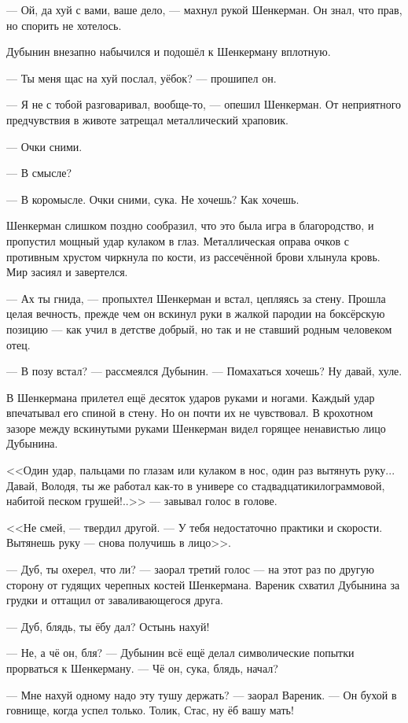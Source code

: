 --- Ой, да хуй с вами, ваше дело, --- махнул рукой Шенкерман.
Он знал, что прав, но спорить не хотелось.

Дубынин внезапно набычился и подошёл к Шенкерману вплотную.

--- Ты меня щас на хуй послал, уёбок? --- прошипел он.

--- Я не с тобой разговаривал, вообще-то, --- опешил Шенкерман.
От неприятного предчувствия в животе затрещал металлический храповик.

--- Очки сними.

--- В смысле?

--- В коромысле.
Очки сними, сука.
Не хочешь?
Как хочешь.

Шенкерман слишком поздно сообразил, что это была игра в благородство, и пропустил мощный удар кулаком в глаз.
Металлическая оправа очков с противным хрустом чиркнула по кости, из рассечённой брови хлынула кровь.
Мир засиял и завертелся.

--- Ах ты гнида, --- пропыхтел Шенкерман и встал, цепляясь за стену.
Прошла целая вечность, прежде чем он вскинул руки в жалкой пародии на боксёрскую позицию --- как учил в детстве добрый, но так и не ставший родным человеком отец.

--- В позу встал? --- рассмеялся Дубынин.
--- Помахаться хочешь?
Ну давай, хуле.

В Шенкермана прилетел ещё десяток ударов руками и ногами.
Каждый удар впечатывал его спиной в стену.
Но он почти их не чувствовал.
В крохотном зазоре между вскинутыми руками Шенкерман видел горящее ненавистью лицо Дубынина.

<<Один удар, пальцами по глазам или кулаком в нос, один раз вытянуть руку...
Давай, Володя, ты же работал как-то в универе со стадвадцатикилограммовой, набитой песком грушей!..>> --- завывал голос в голове.

<<Не смей, --- твердил другой.
--- У тебя недостаточно практики и скорости.
Вытянешь руку --- снова получишь в лицо>>.

--- Дуб, ты охерел, что ли? --- заорал третий голос --- на этот раз по другую сторону от гудящих черепных костей Шенкермана.
Вареник схватил Дубынина за грудки и оттащил от заваливающегося друга.

--- Дуб, блядь, ты ёбу дал?
Остынь нахуй!

--- Не, а чё он, бля? --- Дубынин всё ещё делал символические попытки прорваться к Шенкерману.
--- Чё он, сука, блядь, начал?

--- Мне нахуй одному надо эту тушу держать? --- заорал Вареник.
--- Он бухой в говнище, когда успел только.
Толик, Стас, ну ёб вашу мать!

